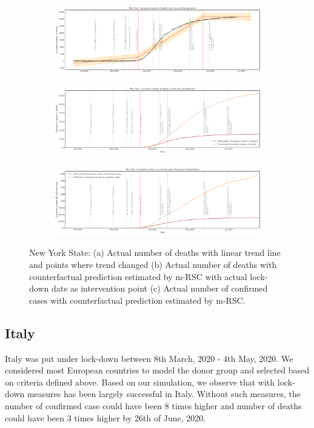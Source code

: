 \documentclass[fleqn,10pt]{wlscirep}
\begin{document}
\begin{figure}
	\centering
	\begin{subfigure}[b]{\textwidth}
		\centering
		\includegraphics[width=0.9\linewidth,height=0.2\textheight]{FIG10}
	\end{subfigure}
	
	\begin{subfigure}[b]{\textwidth}
		\centering
		\includegraphics[width=0.9\linewidth,height=0.2\textheight]{FIG11}
	\end{subfigure}
	
	\begin{subfigure}[b]{\textwidth}
		\centering
		\includegraphics[width=0.9\linewidth,height=0.2\textheight]{FIG12}
	\end{subfigure}
	
	\caption[New York]{New York State: (a) Actual number of deaths with linear trend line and points where trend changed (b) Actual number of deaths with counterfactual prediction estimated by m-RSC with actual lock-down date as intervention point (c) Actual number of confirmed cases with counterfactual prediction estimated by m-RSC.}
	\label{fig5} 
\end{figure}


\subsection*{Italy}
Italy was put under lock-down between 8th March, 2020 - 4th May, 2020. We considered most European countries to model the donor group and selected based on criteria defined above. Based on our simulation, we observe that with lock-down measures  has been largely successful in Italy. Without such measures, the number of confirmed case could have been 8 times higher and number of deaths could have been 3 times higher by 26th of June, 2020.
\end{document}
